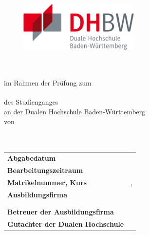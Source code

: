 {
\begin{titlepage}
	\enlargethispage{4cm}
	\begin{figure}
		\begin{minipage}{0.49\textwidth}
			\flushleft
		\end{minipage}
		\hfill
		\begin{minipage}{0.49\textwidth}
			\flushright
			\includegraphics[height=2.5cm]{images/logos/dhbw.pdf} 
		\end{minipage}
	\end{figure} 
	\vspace*{0.1cm}
	\begin{center}
		\huge{\textbf{\titel}}\\[1.5cm]
		\Large{\textbf{\arbeit}}\\[0.5cm]
		\normalsize{im Rahmen der Prüfung zum\\[1ex] \textbf{\abschluss}}\\[0.5cm]
		\Large{des Studienganges \studiengang}\\[1ex]
		\normalsize{an der Dualen Hochschule Baden-Württemberg \abgabeOrt}\\[1cm]
		\normalsize{von}\\[1ex] \Large{\textbf{\vorname\,\nachname}} \\[1cm]
		\normalsize{\bearbeitungsmonat}\\[2.25cm]
		\begin{spacing}{0.8}
			\begin{tabular}{ll}
				\textbf{Abgabedatum}				\hspace{4.5cm}					& \abgabeDatum\\[0.2cm]
				\textbf{Bearbeitungszeitraum}       				&  \bearbeitungszeitraum\\[0.2cm]
				\textbf{Matrikelnummer, Kurs} 					   	&  \matrikelnr, \kurs\\[0.2cm]
				\textbf{Ausbildungsfirma}              					 &  \firmaName\\
																						& \firmaStrasse \\
																						& \firmaPlz\\[0.2cm]
				\textbf{Betreuer der Ausbildungsfirma}          &  \betreuerFirma\\[0.2cm]
				\textbf{Gutachter der Dualen Hochschule}    &  \betreuerDhbw\\[0.2cm]
			\end{tabular} 
		\end{spacing}
	\end{center}
\end{titlepage}
}